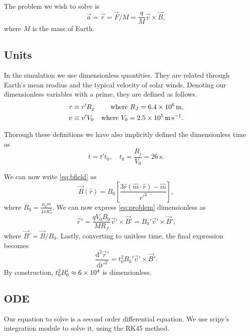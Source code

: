 \documentclass[a4paper, 12pt]{article}
\begin{document}
The problem we wish to solve is
\begin{equation}\label{eq:problem}
  \vec{a} = \ddot{\vec{r}} = \vec{F}/M = \frac{q}{M} \vec{v}\times \vec{B},
\end{equation}
where $M$ is the mass of Earth.

\subsection{Units}
In the simulation we use dimensionless quantities.
They are related through Earth's mean readius and the typical velocity of solar winds.
Denoting our dimensionless variables with a prime, they are defined as follows.
\begin{align}
  r &\equiv r' R_j& \text{where } R_J = \SI{6.4E6}{\meter},\\
  v &\equiv v' V_0& \text{where } V_0 = \SI{2.5E5}{\meter\per\second}.
\end{align}

Thorough these definitions we have also implicitly defined the dimensionless time as
\begin{equation}
  t = t' t_0, \quad t_0 = \frac{R_j}{V_0} = \SI{26}{\second}.
\end{equation}

We can now write \eqref{eq:bfield} as
\begin{equation}
  \vec{B}(\hat{r}) = B_0
  \left[
    \frac{3\hat{r}(\hat{m}\cdot \hat{r}) - \hat{m}}{r'^3}
    \right],
\end{equation}
where $B_0 = \frac{\mu_0 m}{4\pi R_J^3}$.
We can now express \eqref{eq:problem} dimensionless as
\begin{equation}
  \ddot{\vec{r}'} = \frac{q V_0 B_0}{M R_J} \vec{v}' \times \vec{B}' = B_0' \vec{v}' \times \vec{B}',
\end{equation}
where $\vec{B}' = \vec{B}/B_0$.
Lastly, converting to unitless time, the final expression becomes
\begin{equation}
  \frac{\mathrm{d}^2\vec{r}'}{\mathrm{d}t'^2} = t_0^2 B_0' \vec{v}' \times \vec{B}'.
\end{equation}
By construction, $t_0^2 B_0' \approx \num{6E4}$ is dimensionless.

\subsection{ODE}
Our equation to solve is a second order differential equation.
We use scipy's integration module to solve it, using the RK45 method.
\end{document}
